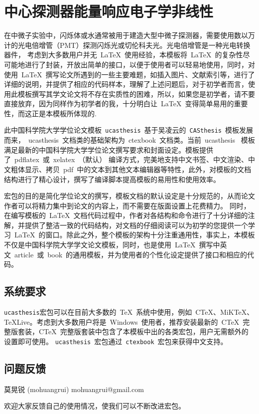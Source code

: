 
\chapter{中心探测器能量响应电子学非线性}
\label{chap:chap4}
在中微子实验中，闪烁体或水通常被用于建造大型中微子探测器，需要使用数以万计的光电倍增管（PMT）探测闪烁光或切伦科夫光。光电倍增管是一种光电转换器件，
考虑到大多数用户并无~\LaTeX{}~使用经验，本模板将~\LaTeX{}~的复杂性尽可能地进行了封装，开放出简单的接口，以便于使用者可以轻易地使用，同时，对使用~\LaTeX{}~撰写论文所遇到的一些主要难题，如插入图片、文献索引等，进行了详细的说明，并提供了相应的代码样本，理解了上述问题后，对于初学者而言，使用此模板撰写其学文论文将不存在实质性的困难，所以，如果您是初学者，请不要直接放弃，因为同样作为初学者的我，十分明白让~\LaTeX{}~变得简单易用的重要性，而这正是本模板所体现的.

此中国科学院大学学位论文模板~\texttt{ucasthesis}~基于吴凌云的~\texttt{CASthesis}~模板发展而来，~ucasthesis~文档类的基础架构为~ctexbook~文档类。当前~ucasthesis~ 模板满足最新的中国科学院大学学位论文撰写要求和封面设定。模板提供了~pdflatex~或~xelatex~（默认） 编译方式，完美地支持中文书签、中文渲染、中文粗体显示、拷贝~pdf~中的文本到其他文本编辑器等特性，此外，对模板的文档结构进行了精心设计，撰写了编译脚本提高模板的易用性和使用效率。

宏包的目的是简化学位论文的撰写，模板文档的默认设定是十分规范的，从而论文作者可以将精力集中到论文的内容上，而不需要在版面设置上花费精力。 同时，在编写模板的~\LaTeX{}~文档代码过程中，作者对各结构和命令进行了十分详细的注解，并提供了整洁一致的代码结构，对文档的仔细阅读可以为初学的您提供一个学习~\LaTeX{}~的窗口。除此之外，整个模板的架构十分注重通用性，事实上，本模板不仅是中国科学院大学学文论文模板，同时，也是使用~\LaTeX{}~撰写中英文~article~或~book~的通用模板，并为使用者的个性化设定提供了接口和相应的代码。

\section{系统要求}

\texttt{ucasthesis}宏包可以在目前大多数的~\TeX{}~系统中使用，例如~C\TeX{}、MiK\TeX{}、\TeX{}Live。考虑到大多数用户将是~Windows~使用者，推荐安装最新的~C\TeX{}~完整版套装，C\TeX{}~完整版套装中包含了本模板中出的各类宏包，用户无需额外的设置即可使用。 \texttt{ucasthesis}~宏包通过~\texttt{ctexbook}~宏包来获得中文支持。

\section{问题反馈}

\begin{center}
莫晃锐 (mohuangrui) \quad mohuangrui@gmail.com
\end{center}

欢迎大家反馈自己的使用情况，使我们可以不断改进宏包。
